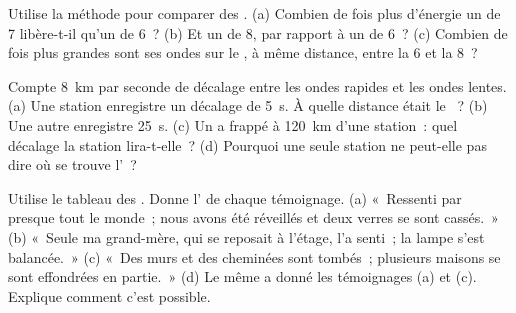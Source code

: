 \begin{exercise}[$\star\star$]\label{exo:g7:earthquakes:6}
Utilise la méthode pour comparer des . (a) Combien de fois plus
d'énergie un  de  7 libère-t-il qu'un  de 
6~? (b) Et un  de  8, par rapport à un  de 
6~? (c) Combien de fois plus grandes sont ses ondes sur le , à
même distance, entre la  6 et la  8~?
\end{exercise}

\begin{exercise}[$\star\star$]\label{exo:g7:earthquakes:7}
Compte \qty{8}{km} par seconde de décalage entre les ondes rapides et les
ondes lentes. (a) Une station enregistre un décalage de \qty{5}{s}. À
quelle distance était le ~? (b) Une autre enregistre \qty{25}{s}.
(c) Un  a frappé à \qty{120}{km} d'une station~: quel décalage la
station lira-t-elle~? (d) Pourquoi une seule station ne peut-elle pas dire
où se trouve l'~?
\end{exercise}

\begin{exercise}[$\star\star$]\label{exo:g7:earthquakes:8}
Utilise le tableau des . Donne l' de chaque
témoignage. (a) «~Ressenti par presque tout le monde~; nous avons été
réveillés et deux verres se sont cassés.~» (b) «~Seule ma grand-mère, qui
se reposait à l'étage, l'a senti~; la lampe s'est balancée.~» (c) «~Des
murs et des cheminées sont tombés~; plusieurs maisons se sont effondrées en
partie.~» (d) Le même  a donné les témoignages (a) et (c). Explique
comment c'est possible.
\end{exercise}

